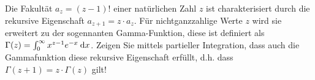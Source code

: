 \item Die Fakultät $a_z = (z-1)!$ einer natürlichen Zahl  $z$ ist charakterisiert durch die rekursive Eigenschaft $a_{z+1} = z\cdot a_z$. Für nichtganzzahlige Werte $z$ wird sie erweitert zu der sogennanten Gamma-Funktion, diese ist definiert als $\Gamma(z) = \int_0^\infty x^{z-1} e^{-x} \:\mathrm{d}{x}$. Zeigen Sie mittels partieller Integration, dass auch die Gammafunktion diese rekursive Eigenschaft erfüllt, d.h. dass $\Gamma(z+1) = z \cdot \Gamma(z)$ gilt!
